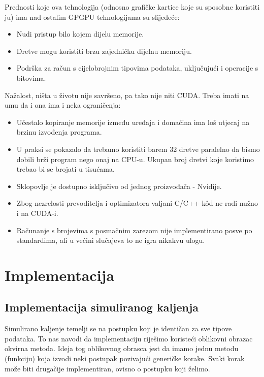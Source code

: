 \documentclass[times, utf8, zavrsni]{fer}
\begin{document}
Prednosti koje ova tehnologija (odnosno grafičke kartice koje su
sposobne koristiti ju) ima nad ostalim GPGPU tehnologijama
su slijedeće:

\begin{itemize}
\item
Nudi pristup bilo kojem dijelu memorije. 

\item
Dretve mogu koristiti brzu zajedničku dijelnu memoriju. 

\item
Podrška za račun s cijelobrojnim tipovima podataka, uključujući
i operacije s bitovima.
\end{itemize}

Nažalost, ništa u životu nije savršeno, pa tako nije niti CUDA.
Treba imati na umu da i ona ima i neka ograničenja:

\begin{itemize}
\item
Učestalo kopiranje memorije između uređaja i domaćina ima loš
utjecaj na brzinu izvođenja programa.

\item
U praksi se pokazalo da trebamo koristiti barem 32 dretve paralelno
da bismo dobili brži program nego onaj na CPU-u. Ukupan broj dretvi
koje koristimo trebao bi se brojati u tisućama. 

\item
Sklopovlje je dostupno isključivo od jednog proizvođača - Nvidije. 

\item
Zbog nezrelosti prevoditelja i optimizatora valjani C/C++ kôd
ne radi nužno i na CUDA-i. 

\item
Računanje s brojevima s posmačnim zarezom nije implementirano posve
po standardima, ali u većini slučajeva to ne igra nikakvu ulogu.
\end{itemize}







\chapter{Implementacija}


\section{Implementacija simuliranog kaljenja}
Simulirano kaljenje temelji se na postupku koji je identičan
za sve tipove podataka. To nas navodi da implementaciju 
riješimo koristeći oblikovni obrazac okvirna metoda. 
Ideja tog oblikovnog obrasca jest da imamo jednu
metodu (funkciju) koja izvodi neki postupak pozivajući
generičke korake. Svaki korak može biti drugačije implementiran,
ovisno o postupku koji želimo. 
\end{document}
